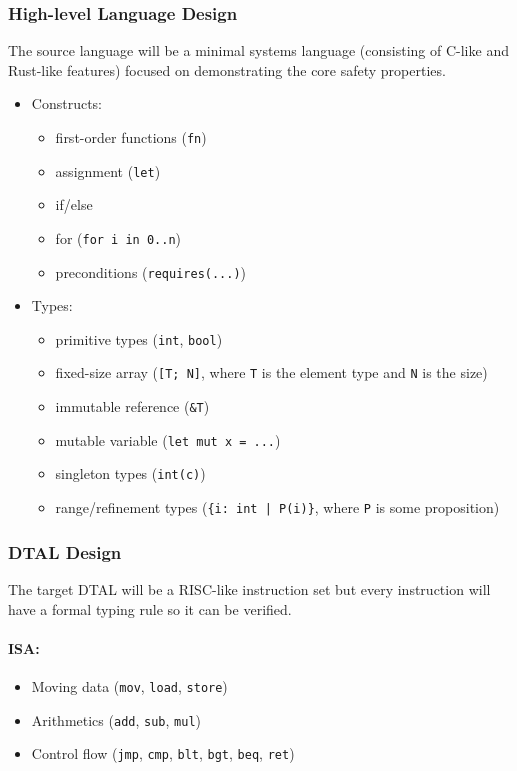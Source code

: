 \documentclass[a4paper, 12pt]{article}
\begin{document}
\subsubsection*{High-level Language Design}

The source language will be a minimal systems language (consisting of C-like and Rust-like features) focused on demonstrating the core safety properties.

\begin{itemize}
  \item Constructs:
    \begin{itemize}
      \item first-order functions (\texttt{fn})
      \item assignment (\texttt{let})
      \item if/else
      \item for (\texttt{for i in 0..n})
      \item preconditions (\texttt{requires(...)})
    \end{itemize}
  \item Types:
    \begin{itemize}
      \item primitive types (\texttt{int}, \texttt{bool})
      \item fixed-size array (\texttt{[T; N]}, where \texttt{T} is the element type and \texttt{N} is the size)
      \item immutable reference (\texttt{\&T})
      \item mutable variable (\texttt{let mut x = ...})
      \item singleton types (\texttt{int(c)})
      \item range/refinement types (\texttt{\{i: int | P(i)\}}, where \texttt{P} is some proposition)
    \end{itemize}
\end{itemize}

\subsubsection*{DTAL Design}

The target DTAL will be a RISC-like instruction set but every instruction will have a formal typing rule so it can be verified.

\paragraph{ISA:}
\begin{itemize}
  \item Moving data (\texttt{mov}, \texttt{load}, \texttt{store})
  \item Arithmetics (\texttt{add}, \texttt{sub}, \texttt{mul})
  \item Control flow (\texttt{jmp}, \texttt{cmp}, \texttt{blt}, \texttt{bgt}, \texttt{beq}, \texttt{ret})
\end{itemize}
\end{document}
